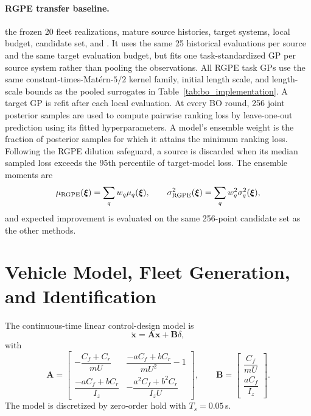 \documentclass[11pt]{article}
\begin{document}
\paragraph{RGPE transfer baseline.}
 the frozen 20 fleet realizations, mature source histories, target systems, local budget, candidate set, and . It uses the same 25 historical evaluations per source and the same target evaluation budget, but fits one task-standardized GP per source system rather than pooling the observations. All RGPE task GPs use the same constant-times-Mat\'ern-$5/2$ kernel family, initial length scale, and length-scale bounds as the pooled surrogates in Table~\ref{tab:bo_implementation}. A target GP is refit after each local evaluation. At every BO round, 256 joint posterior samples are used to compute pairwise ranking loss  by leave-one-out prediction using its fitted hyperparameters. A model's ensemble weight is the fraction of posterior samples for which it attains the minimum ranking loss. Following the RGPE dilution safeguard, a source is discarded when its median sampled loss exceeds the 95th percentile of target-model loss. The ensemble moments are
\begin{equation}
 \mu_{\rm RGPE}(\boldsymbol\xi)=\sum_q w_q\mu_q(\boldsymbol\xi),
 \qquad
 \sigma_{\rm RGPE}^2(\boldsymbol\xi)=\sum_q w_q^2\sigma_q^2(\boldsymbol\xi),
\end{equation}
and expected improvement is evaluated on the same 256-point candidate set as the other methods.

\section{Vehicle Model, Fleet Generation, and Identification}

The continuous-time linear control-design model is
\begin{equation}
 \dot{\mathbf{x}}=\mathbf A\mathbf x+\mathbf B\delta,
\end{equation}
with
\begin{equation}
\mathbf{A}=\begin{bmatrix}
-\dfrac{C_f+C_r}{mU} & \dfrac{-aC_f+bC_r}{mU^2}-1\\[2mm]
\dfrac{-aC_f+bC_r}{I_z} & -\dfrac{a^2C_f+b^2C_r}{I_zU}
\end{bmatrix},
\qquad
\mathbf{B}=\begin{bmatrix}\dfrac{C_f}{mU}\\[2mm]\dfrac{aC_f}{I_z}\end{bmatrix}.
\end{equation}
The model is discretized by zero-order hold with $T_s=0.05$\,s.
\end{document}
